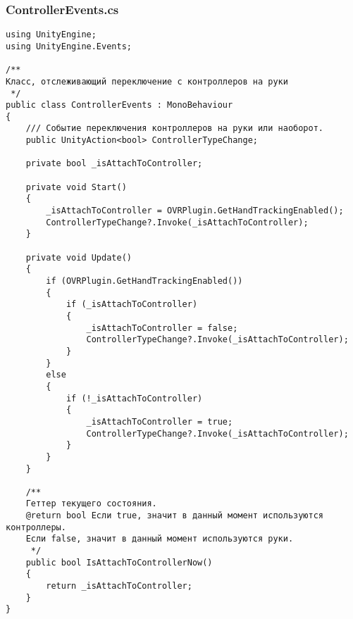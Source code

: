 \subsubsection*{ControllerEvents.cs}
\begin{verbatim}
﻿using UnityEngine;
using UnityEngine.Events;

/**
Класс, отслеживающий переключение с контроллеров на руки
 */
public class ControllerEvents : MonoBehaviour
{
    /// Событие переключения контроллеров на руки или наоборот.
    public UnityAction<bool> ControllerTypeChange;

    private bool _isAttachToController;

    private void Start()
    {
        _isAttachToController = OVRPlugin.GetHandTrackingEnabled();
        ControllerTypeChange?.Invoke(_isAttachToController);
    }

    private void Update()
    {
        if (OVRPlugin.GetHandTrackingEnabled())
        {
            if (_isAttachToController)
            {
                _isAttachToController = false;
                ControllerTypeChange?.Invoke(_isAttachToController);
            }
        }
        else
        {
            if (!_isAttachToController)
            {
                _isAttachToController = true;
                ControllerTypeChange?.Invoke(_isAttachToController);
            }
        }
    }

    /**
    Геттер текущего состояния.
    @return bool Если true, значит в данный момент используются контроллеры.
    Если false, значит в данный момент используются руки.
     */
    public bool IsAttachToControllerNow()
    {
        return _isAttachToController;
    }
}

\end{verbatim}
